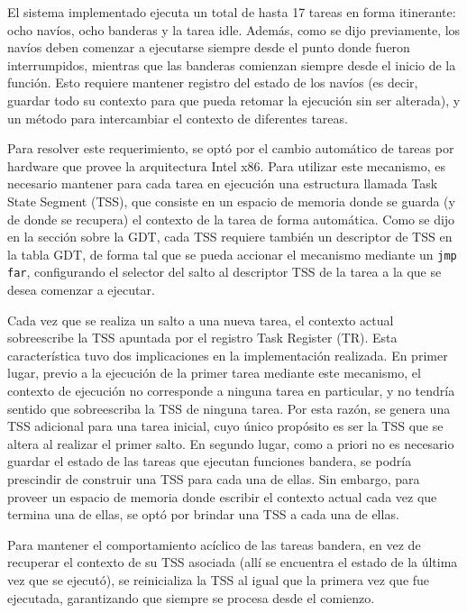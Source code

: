 	El sistema implementado ejecuta un total de hasta 17 tareas en forma itinerante: 
ocho navíos, ocho banderas y la tarea idle. Además, como se dijo previamente, 
los navíos deben comenzar a ejecutarse siempre desde el punto donde fueron interrumpidos, 
mientras que las banderas comienzan siempre desde el inicio de la función. Esto requiere 
mantener registro del estado de los navíos (es decir, guardar todo su contexto para que 
pueda retomar la ejecución sin ser alterada), y un método para intercambiar el contexto 
de diferentes tareas.

	Para resolver este requerimiento, se optó por el cambio automático 
de tareas por hardware que provee la arquitectura Intel x86. Para utilizar este mecanismo, 
es necesario mantener para cada tarea en ejecución una estructura llamada Task State 
Segment (TSS), que consiste en un espacio de memoria donde se guarda (y de donde se 
recupera) el contexto de la tarea de forma automática. Como se dijo en la sección sobre la GDT, 
cada TSS requiere también un descriptor de TSS en la tabla GDT, de forma tal que se pueda 
accionar el mecanismo mediante un \texttt{jmp far}, configurando el selector del salto 
al descriptor TSS de la tarea a la que se desea comenzar a ejecutar.

	Cada vez que se realiza un salto a una nueva tarea, el contexto actual sobreescribe 
la TSS apuntada por el registro Task Register (TR). Esta característica tuvo dos implicaciones 
en la implementación realizada. En primer lugar, previo a la ejecución de la primer tarea 
mediante este mecanismo, el contexto de ejecución no corresponde a ninguna tarea en particular, y 
no tendría sentido que sobreescriba la TSS de ninguna tarea. Por esta razón, se genera una 
TSS adicional para una tarea inicial, cuyo único propósito es ser la TSS que se altera 
al realizar el primer salto. En segundo lugar, como a priori no es necesario guardar el estado de las tareas que ejecutan funciones bandera, se podría prescindir de construir una TSS para cada 
una de ellas. Sin embargo, para proveer un espacio de memoria donde escribir el contexto actual 
cada vez que termina una de ellas, se optó por brindar una TSS a cada una de ellas.

	Para mantener el comportamiento acíclico de las tareas bandera, en vez de recuperar el 
contexto de su TSS asociada (allí se encuentra el estado de la última vez que se ejecutó), se
reinicializa la TSS al igual que la primera vez que fue ejecutada, garantizando que siempre se
procesa desde el comienzo.	
